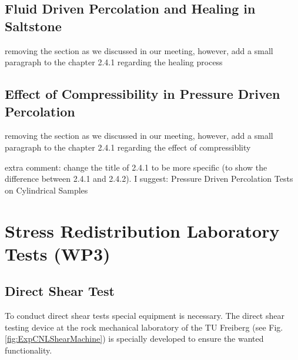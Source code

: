 \subsection{Fluid Driven Percolation and Healing in Saltstone}

 removing the section as we discussed in our meeting, however, add a small paragraph to the chapter 2.4.1 regarding the healing process

\subsection{Effect of Compressibility in Pressure Driven Percolation}

removing the section as we discussed in our meeting, however, add a small paragraph to the chapter 2.4.1 regarding the effect of compressiblity

extra comment: change the title of 2.4.1 to be more specific (to show the difference between 2.4.1 and 2.4.2). I suggest: Pressure Driven Percolation Tests on Cylindrical Samples

\section{Stress Redistribution Laboratory Tests (WP3)}
\subsection{Direct Shear Test}
To conduct direct shear tests special equipment is necessary. The direct shear testing device at the rock mechanical laboratory of the TU Freiberg (see Fig. \ref{fig:ExpCNLShearMachine}) is specially developed to ensure the wanted functionality.\\


